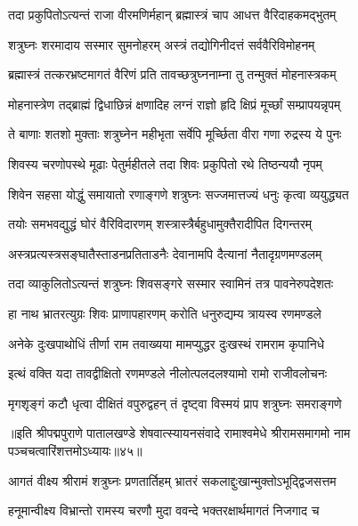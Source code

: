 \twolineshloka
{तदा प्रकुपितोऽत्यन्तं राजा वीरमणिर्महान्}
{ब्रह्मास्त्रं चाप आधत्त वैरिदाहकमद्भुतम्}%

\twolineshloka
{शत्रुघ्नः शरमादाय सस्मार सुमनोहरम्}
{अस्त्रं तद्योगिनीदत्तं सर्ववैरिविमोहनम्}%

\twolineshloka
{ब्रह्मास्त्रं तत्करभ्रष्टमागतं वैरिणं प्रति}
{तावच्छत्रुघ्ननाम्ना तु तन्मुक्तं मोहनास्त्रकम्}%

\twolineshloka
{मोहनास्त्रेण तद्ब्राह्मं द्विधाछिन्नं क्षणादिह}
{लग्नं राज्ञो हृदि क्षिप्रं मूर्च्छां सम्प्रापयन्नृपम्}%

\twolineshloka
{ते बाणाः शतशो मुक्ताः शत्रुघ्नेन महीभृता}
{सर्वेपि मूर्च्छिता वीरा गणा रुद्रस्य ये पुनः}%

\twolineshloka
{शिवस्य चरणोपस्थे मूढाः पेतुर्महीतले}
{तदा शिवः प्रकुपितो रथे तिष्ठन्ययौ नृपम्}%

\twolineshloka
{शिवेन सहसा योद्धुं समायातो रणाङ्गणे}
{शत्रुघ्नः सज्जमात्तज्यं धनुः कृत्वा व्ययुद्ध्यत}%

\twolineshloka
{तयोः समभवद्युद्धं घोरं वैरिविदारणम्}
{शस्त्रास्त्रैर्बहुधामुक्तैरादीपित दिगन्तरम्}%

\twolineshloka
{अस्त्रप्रत्यस्त्रसङ्घातैस्ताडनप्रतिताडनैः}
{देवानामपि दैत्यानां नैतादृग्रणमण्डलम्}%

\twolineshloka
{तदा व्याकुलितोऽत्यन्तं शत्रुघ्नः शिवसङ्गरे}
{सस्मार स्वामिनं तत्र पावनेरुपदेशतः}%

\twolineshloka
{हा नाथ भ्रातरत्युग्रः शिवः प्राणापहारणम्}
{करोति धनुरुद्यम्य त्रायस्व रणमण्डले}%

\twolineshloka
{अनेके दुःखपाथोधिं तीर्णा राम तवाख्यया}
{मामप्युद्धर दुःखस्थं रामराम कृपानिधे}%

\twolineshloka
{इत्थं वक्ति यदा तावद्वीक्षितो रणमण्डले}
{नीलोत्पलदलश्यामो रामो राजीवलोचनः}%

\twolineshloka
{मृगशृङ्गं कटौ धृत्वा दीक्षितं वपुरुद्वहन्}
{तं दृष्ट्वा विस्मयं प्राप शत्रुघ्नः समराङ्गणे}%

{॥इति श्रीपद्मपुराणे पातालखण्डे शेषवात्स्यायनसंवादे रामाश्वमेधे श्रीरामसमागमो नाम पञ्चचत्वारिंशत्तमोऽध्यायः॥४५॥}



\twolineshloka
{आगतं वीक्ष्य श्रीरामं शत्रुघ्नः प्रणतार्तिहम्}
{भ्रातरं सकलाद्दुःखान्मुक्तोऽभूद्द्विजसत्तम}%

\twolineshloka
{हनूमान्वीक्ष्य विभ्रान्तो रामस्य चरणौ मुदा}
{ववन्दे भक्तरक्षार्थमागतं निजगाद च}%

